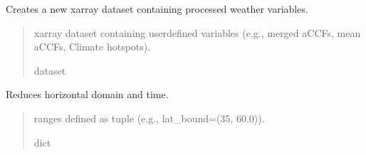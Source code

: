 \documentclass[a4paper,11pt,english]{sphinxmanual}
\begin{document}
\begin{fulllineitems}
\begin{fulllineitems}
\begin{quote}
\begin{description}
\begin{itemize}
\end{itemize}

\end{description}\end{quote}

\end{fulllineitems}


\begin{fulllineitems}
\label{\detokenize{modules:envlib.weather_store.WeatherStore.get_xarray}}
\pysigstartsignatures
{}
\pysigstopsignatures
\sphinxAtStartPar
Creates a new xarray dataset containing processed weather variables.
\begin{quote}\begin{description}
\sphinxAtStartPar
xarray dataset containing user\sphinxhyphen{}defined variables (e.g., merged aCCFs, mean aCCFs, Climate hotspots).

\sphinxAtStartPar
dataset

\end{description}\end{quote}

\end{fulllineitems}


\begin{fulllineitems}
\label{\detokenize{modules:envlib.weather_store.WeatherStore.reduce_domain}}
\pysigstartsignatures
{}
\pysigstopsignatures
\sphinxAtStartPar
Reduces horizontal domain and time.
\begin{quote}\begin{description}
\sphinxAtStartPar
{} \textendash{} ranges defined as tuple (e.g., lat\_bound=(35, 60.0)).

\sphinxAtStartPar
dict

\end{description}\end{quote}

\end{fulllineitems}


\end{fulllineitems}
\end{document}
